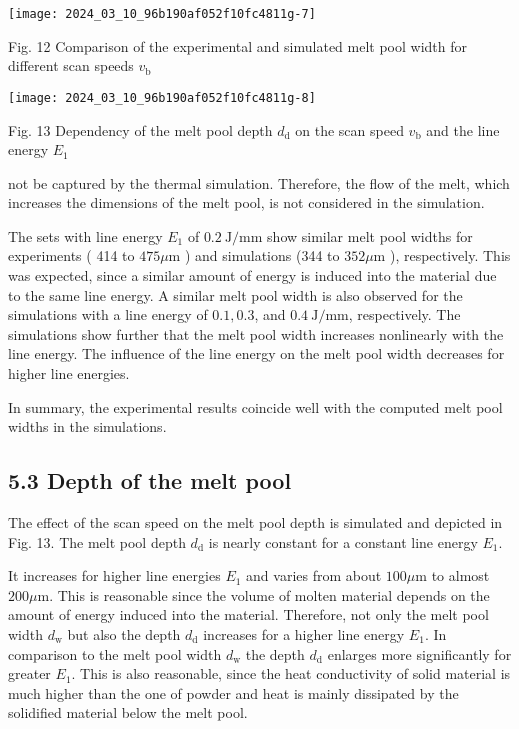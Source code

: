 \documentclass[10pt]{article}
\begin{document}
\begin{center}
\texttt{[image: 2024\_03\_10\_96b190af052f10fc4811g-7]}
\end{center}

Fig. 12 Comparison of the experimental and simulated melt pool width for different scan speeds $v_{\mathrm{b}}$

\begin{center}
\texttt{[image: 2024\_03\_10\_96b190af052f10fc4811g-8]}
\end{center}

Fig. 13 Dependency of the melt pool depth $d_{\mathrm{d}}$ on the scan speed $v_{\mathrm{b}}$ and the line energy $E_{1}$

not be captured by the thermal simulation. Therefore, the flow of the melt, which increases the dimensions of the melt pool, is not considered in the simulation.

The sets with line energy $E_{1}$ of $0.2 \mathrm{~J} / \mathrm{mm}$ show similar melt pool widths for experiments ( 414 to $475 \mu \mathrm{m}$ ) and simulations (344 to $352 \mu \mathrm{m}$ ), respectively. This was expected, since a similar amount of energy is induced into the material due to the same line energy. A similar melt pool width is also observed for the simulations with a line energy of $0.1,0.3$, and $0.4 \mathrm{~J} / \mathrm{mm}$, respectively. The simulations show further that the melt pool width increases nonlinearly with the line energy. The influence of the line energy on the melt pool width decreases for higher line energies.

In summary, the experimental results coincide well with the computed melt pool widths in the simulations.

\subsection*{5.3 Depth of the melt pool}
The effect of the scan speed on the melt pool depth is simulated and depicted in Fig. 13. The melt pool depth $d_{\mathrm{d}}$ is nearly constant for a constant line energy $E_{1}$.

It increases for higher line energies $E_{1}$ and varies from about $100 \mu \mathrm{m}$ to almost $200 \mu \mathrm{m}$. This is reasonable since the volume of molten material depends on the amount of energy induced into the material. Therefore, not only the melt pool width $d_{\mathrm{w}}$ but also the depth $d_{\mathrm{d}}$ increases for a higher line energy $E_{1}$. In comparison to the melt pool width $d_{\mathrm{w}}$ the depth $d_{\mathrm{d}}$ enlarges more significantly for greater $E_{1}$. This is also reasonable, since the heat conductivity of solid material is much higher than the one of powder and heat is mainly dissipated by the solidified material below the melt pool.
\end{document}
